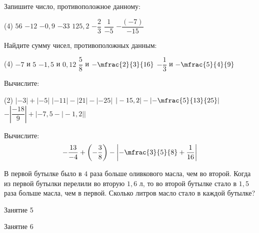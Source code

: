 \begin{homework}[number=2]
	\begin{listofex}
		\item Запишите число, противоположное данному:
		\begin{tasks}(4)
			\task \( 56  \)
			\task \( -12 \)
			\task \( -0,9 \)
			\task \( -33 \)
			\task \( 125,2 \)
			\task \( -\dfrac{2}{3} \)
			\task \( \dfrac{1}{-5} \)
			\task \( -\dfrac{(-7)}{-15} \)
		\end{tasks}
		\item Найдите сумму чисел, противоположных данным:
		\begin{tasks}(4)
			\task \( -7  \) и \( 5 \)
			\task \( -1,5  \) и \( 0,12 \)
			\task \( \dfrac{5}{8}  \) и \( -\mfrac{2}{3}{16} \)
			\task \( -\dfrac{1}{3}  \) и \( -\mfrac{5}{4}{9} \)
		\end{tasks}
		\item Вычислите:
		\begin{tasks}(2)
			\task \(  |-3|+|-5| \)
			\task \( |-11|-|21|-|-25|  \)
			\task \(  |-15,2|-\left|-\mfrac{5}{13}{25}\right| \)
			\task \(  -\left|\dfrac{-18}{9}\right| + |-7,5-|-1,2|| \)
		\end{tasks}
		\item Вычислите: \[ -\dfrac{13}{-4} + \left(-\dfrac{3}{8}\right) - \left|-\mfrac{3}{5}{8}+\dfrac{1}{16}\right| \]
		\item В первой бутылке было в \(4\) раза больше оливкового масла, чем во второй. Когда из первой бутылки перелили во вторую \(1,6\) л, то во второй бутылке стало в \(1,5\) раза больше масла, чем в первой. Сколько литров масло стало в каждой бутылке?
	\end{listofex}
\end{homework}

\begin{class}[number=5]
	\begin{listofex}
		\item Занятие 5
	\end{listofex}
\end{class}

\begin{class}[number=6]
	\begin{listofex}
		\item Занятие 6
	\end{listofex}
\end{class}


